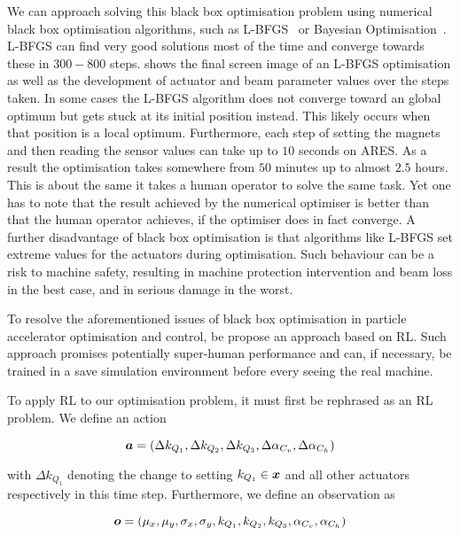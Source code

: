 We can approach solving this black box optimisation problem using numerical black box optimisation algorithms, such as L-BFGS~\cite{TODO} or Bayesian Optimisation~\cite{TODO}. L-BFGS can find very good solutions most of the time and converge towards these in $300-800$ steps.  shows the final screen image of an L-BFGS optimisation as well as the development of actuator and beam parameter values over the steps taken. In some cases the L-BFGS algorithm does not converge toward an global optimum but gets stuck at its initial position instead. This likely occurs when that position is a local optimum. Furthermore, each step of setting the magnets and then reading the sensor values can take up to $10$ seconds on ARES. As a result the optimisation takes somewhere from $50$ minutes up to almost $2.5$ hours. This is about the same it takes a human operator to solve the same task. Yet one has to note that the result achieved by the numerical optimiser is better than that the human operator achieves, if the optimiser does in fact converge. A further disadvantage of black box optimisation is that algorithms like L-BFGS set extreme values for the actuators during optimisation. Such behaviour can be a risk to machine safety, resulting in machine protection intervention and beam loss in the best case, and in serious damage in the worst.

To resolve the aforementioned issues of black box optimisation in particle accelerator optimisation and control, be propose an approach based on \ac{RL}. Such approach promises potentially super-human performance and can, if necessary, be trained in a save simulation environment before every seeing the real machine.

To apply \ac{RL} to our optimisation problem, it must first be rephrased as an \ac{RL} problem. We define an action

\begin{equation}
    \bm{a} = (\Delta k_{Q_1}, \Delta k_{Q_2}, \Delta k_{Q_3}, \Delta \alpha_{C_v}, \Delta \alpha_{C_h})
\end{equation}

with $\Delta k_{Q_1}$ denoting the change to setting $k_{Q_1} \in \bm{x}$ and all other actuators respectively in this time step. Furthermore, we define an observation as

\begin{equation}
    \bm{o} = (\mu_x, \mu_y, \sigma_x, \sigma_y, k_{Q_1}, k_{Q_2}, k_{Q_3}, \alpha_{C_v}, \alpha_{C_h})
\end{equation}

